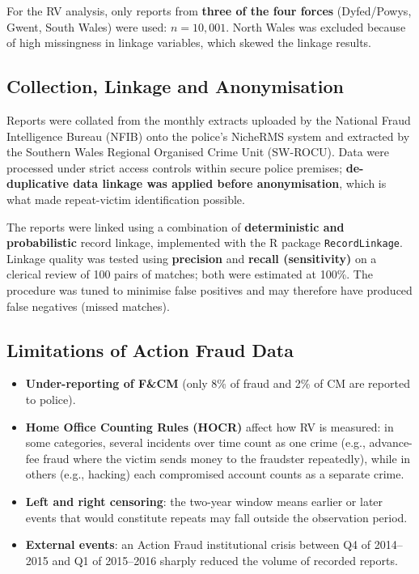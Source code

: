 \documentclass[11pt,a4paper,openany]{report}
\theoremstyle{definition}
\theoremstyle{plain}
\theoremstyle{remark}
\begin{document}
For the RV analysis, only reports from \textbf{three of the four forces} (Dyfed/Powys, Gwent, South Wales) were used: $n = 10{,}001$. North Wales was excluded because of high missingness in linkage variables, which skewed the linkage results.

\subsection{Collection, Linkage and Anonymisation}

Reports were collated from the monthly extracts uploaded by the National Fraud Intelligence Bureau (NFIB) onto the police's NicheRMS system and extracted by the Southern Wales Regional Organised Crime Unit (SW-ROCU). Data were processed under strict access controls within secure police premises; \textbf{de-duplicative data linkage was applied before anonymisation}, which is what made repeat-victim identification possible.

The reports were linked using a combination of \textbf{deterministic and probabilistic} record linkage, implemented with the R package \texttt{RecordLinkage}. Linkage quality was tested using \textbf{precision} and \textbf{recall (sensitivity)} on a clerical review of 100 pairs of matches; both were estimated at 100\%. The procedure was tuned to minimise false positives and may therefore have produced false negatives (missed matches).

\subsection{Limitations of Action Fraud Data}

\begin{itemize}
    \item \textbf{Under-reporting of F\&CM} (only 8\% of fraud and 2\% of CM are reported to police).
    \item \textbf{Home Office Counting Rules (HOCR)} affect how RV is measured: in some categories, several incidents over time count as one crime (e.g., advance-fee fraud where the victim sends money to the fraudster repeatedly), while in others (e.g., hacking) each compromised account counts as a separate crime.
    \item \textbf{Left and right censoring}: the two-year window means earlier or later events that would constitute repeats may fall outside the observation period.
    \item \textbf{External events}: an Action Fraud institutional crisis between Q4 of 2014--2015 and Q1 of 2015--2016 sharply reduced the volume of recorded reports.
\end{itemize}
\end{document}

